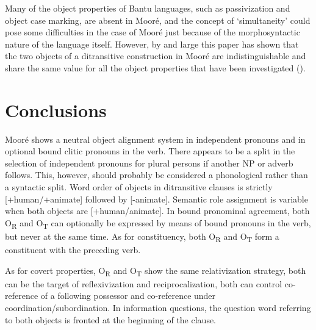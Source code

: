 \documentclass[output=paper]{langsci/langscibook}
\begin{document}
Many of the object properties of Bantu languages, such as passivization and object case marking, are absent in Mooré, and the concept of `simultaneity' could pose some difficulties in the case of Mooré just because of the morphosyntactic nature of the language itself. However, by and large this paper has shown that the two objects of a ditransitive construction in Mooré are indistinguishable and share the same value for all the object properties that have been investigated ().  

\section{Conclusions}\label{§7:conclusions.pacchiarotti}

Mooré shows a neutral object alignment system in independent pronouns and in optional bound clitic pronouns in the verb. There appears to be a split in the selection of independent pronouns for plural persons if another NP or adverb follows. This, however, should probably be considered a phonological rather than a syntactic split. Word order of objects in ditransitive clauses is strictly [+human/+animate] followed by [-animate]. Semantic role assignment is variable when both objects are [+human/animate]. In bound pronominal agreement, both O\textsubscript{R} and O\textsubscript{T} can optionally be expressed by means of bound pronouns in the verb, but never at the same time. As for constituency, both O\textsubscript{R} and O\textsubscript{T} form a constituent with the preceding verb. 

As for covert properties, O\textsubscript{R} and O\textsubscript{T} show the same relativization strategy, both can be the target of reflexivization and reciprocalization, both can control co-reference of a following possessor and co-reference under coordination/subordination. In information questions, the question word referring to both objects is fronted at the beginning of the clause. 
\end{document}
